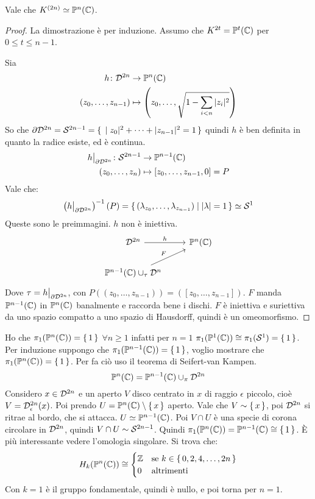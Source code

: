 \begin{proposition}
  Vale che $ K^{(2n)} \simeq \Pjc{n} $.
\end{proposition}
\begin{proof}
  La dimostrazione è per induzione. Assumo che $ K^{2t} = \Pjc{t} $ per $ 0 \leq t \leq n-1 $.

  Sia
  \begin{align*}
    h \colon \Disk{2n} & \to \Pjc{n} \\
    (z_0, \dots, z_{n-1}) & \mapsto \left(z_0,\dots, \sqrt{1 - \sum_{i < n}|z_i|^2} \right)
  \end{align*}
  So che $ \partial \Disk{2n} = \Sph{2n-1} = \set{|z_0|^2 + \dots + |z_{n-1}|^2 = 1} $
  quindi $ h $ è ben definita in quanto la radice esiste, ed è continua.
  \begin{align*}
    h \big \lvert_{\partial \Disk{2n}} \colon \Sph{2n-1} & \to \Pjc{n-1} \\
    (z_0, \dots, z_{n}) & \mapsto [z_0, \dots, z_{n-1}, 0] = P
  \end{align*}
  Vale che:
  \[
    \left( h \big \lvert_{\partial \Disk{2n}}\right)^{-1}(P) = \set{ (\lambda_{z_0}, \dots, \lambda_{z_{n-1}}) | |\lambda| = 1} \simeq \Sph{1}
  \]
  Queste sono le preimmagini. $ h $ non è iniettiva.
  \[
    \begin{tikzcd}
      \Disk{2n} \rar{h} & \Pjc{n} \\
      \Pjc{n-1} \cup_\tau \Disk{n} \arrow{ur}{F} & {}
    \end{tikzcd}
  \]
  Dove $ \tau = h \big \lvert_{\partial \Disk{2n}} $, con $ P((z_0, \dots, z_{n-1})) = ([z_0, \dots, z_{n-1}]) $.
  $ F $ manda $ \Pjc{n-1} $ in $ \Pjc{n} $ banalmente e raccorda bene i dischi.
  $ F $ è iniettiva e suriettiva da uno spazio compatto a uno spazio di Hausdorff,
  quindi è un omeomorfismo.
\end{proof}

Ho che $ \pi_1(\Pjc{n}) = \set{1} $ $ \forall n \geq 1 $
infatti per $ n = 1 $ $ \pi_1(\Pjc{1}) \cong \pi_1(\Sph[1]) = \set{1} $.
Per induzione suppongo che $ \pi_1(\Pjc{n-1}) = \set{1} $, voglio
mostrare che $ \pi_1(\Pjc{n}) = \set{1} $. Per fa ciò
uso il teorema di Seifert-van Kampen.
\[
  \Pjc{n} = \Pjc{n-1} \cup_\pi \Disk{2n}
\]
Considero $ x \in \Disk{2n} $ e un aperto $ V $ disco centrato in $ x $
di raggio $ \epsilon $ piccolo, cioè $ V = \Disk{2n}_\epsilon(x) $. Poi prendo
$ U = \Pjc{n} \setminus \set{x} $ aperto.
Vale che $ V \sim \set{x} $, poi $ \Disk{2n} $ si ritrae al bordo, che
si attacca. $ U \simeq \Pjc{n-1} $.
Poi $ V \cap U $ è una specie di corona circolare in $ \Disk{2n} $,
quindi $ V \cap U \sim \Sph{2n -1} $. Quindi $ \pi_1(\Pjc{n}) = \Pjc{n-1} \cong \set{1} $.
È più interessante vedere l'omologia singolare.
Si trova che:
\[
  H_k(\Pjc{n}) \cong
  \begin{cases}
    \Z & \text{se } k \in \set{0,2,4,\dots, 2n} \\
    0 & \text{altrimenti}
  \end{cases}
\]
Con $ k = 1 $ è il gruppo fondamentale, quindi è nullo, e poi torna per $ n = 1 $.

